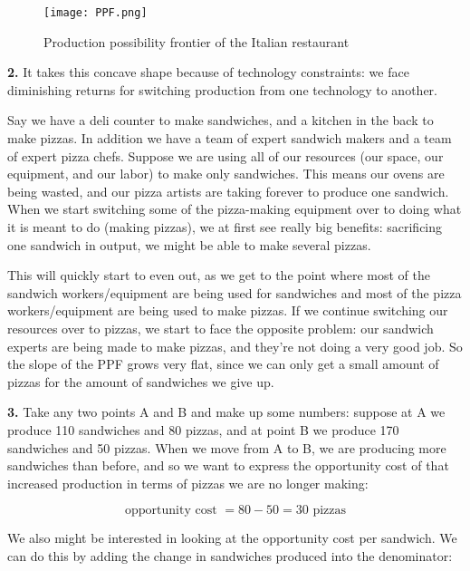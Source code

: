 \documentclass[12pt]{article}
\begin{document}
\begin{figure}
    \centering
    \texttt{[image: PPF.png]}
    \caption{Production possibility frontier of the Italian restaurant}
    \label{fig:PPF}
\end{figure}

\medskip

\textbf{2.} It takes this concave shape because of technology constraints: we face diminishing returns for switching production from one technology to another. 

\medskip

Say we have a deli counter to make sandwiches, and a kitchen in the back to make pizzas. In addition we have a team of expert sandwich makers and a team of expert pizza chefs. Suppose we are using all of our resources (our space, our equipment, and our labor) to make only sandwiches. This means our ovens are being wasted, and our pizza artists are taking forever to produce one sandwich. When we start switching some of the pizza-making equipment over to doing what it is meant to do (making pizzas), we at first see really big benefits: sacrificing one sandwich in output, we might be able to make several pizzas. 

\medskip

This will quickly start to even out, as we get to the point where most of the sandwich workers/equipment are being used for sandwiches and most of the pizza workers/equipment are being used to make pizzas. If we continue switching our resources over to pizzas, we start to face the opposite problem: our sandwich experts are being made to make pizzas, and they're not doing a very good job. So the slope of the PPF grows very flat, since we can only get a small amount of pizzas for the amount of sandwiches we give up.

\medskip

\textbf{3.} Take any two points A and B and make up some numbers: suppose at A we produce 110 sandwiches and 80 pizzas, and at point B we produce 170 sandwiches and 50 pizzas. When we move from A to B, we are producing more sandwiches than before, and so we want to express the opportunity cost of that increased production in terms of pizzas we are no longer making:

$$
\text{opportunity cost } = 80 - 50 = 30 \text{ pizzas}
$$

We also might be interested in looking at the opportunity cost per sandwich. We can do this by adding the change in sandwiches produced into the denominator:
\end{document}
